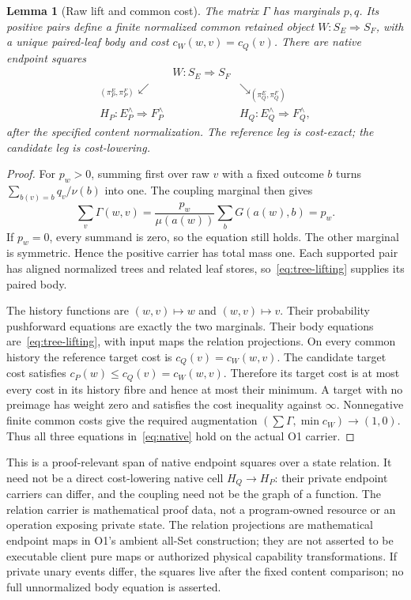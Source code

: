\documentclass[11pt,a4paper]{article}
\newtheorem{lemma}[theorem]{Lemma}
\theoremstyle{definition}
\begin{document}
\begin{lemma}[Raw lift and common cost]\label{lem:raw-lift}
The matrix $\Gamma$ has marginals $p,q$. Its positive pairs define a
finite normalized common retained object
$W:S_E\Rightarrow S_F$, with a unique paired-leaf body and cost
$c_W(w,v)=c_Q(v)$. There are native endpoint squares
\begin{equation}\label{eq:span}
 \begin{array}{ccc}
 &W:S_E\Rightarrow S_F&\\[-2pt]
 {}_{(\pi^E_P,\pi^F_P)}\swarrow&&
       \searrow_{(\pi^E_Q,\pi^F_Q)}\\[-2pt]
 H_P:E_P^{\wedge}\Rightarrow F_P^{\wedge}
 &&H_Q:E_Q^{\wedge}\Rightarrow F_Q^{\wedge},
 \end{array}
\end{equation}
after the specified content normalization. The reference leg is
cost-exact; the candidate leg is cost-lowering.
\end{lemma}
\begin{proof}
For $p_w>0$, summing first over raw $v$ with a fixed outcome $b$ turns
$\sum_{b(v)=b}q_v/\nu(b)$ into one. The coupling marginal then gives
\[
 \sum_v\Gamma(w,v)
 =\frac{p_w}{\mu(a(w))}\sum_bG(a(w),b)=p_w.
\]
If $p_w=0$, every summand is zero, so the equation still holds. The
other marginal is symmetric. Hence the positive carrier has total mass
one. Each supported pair has aligned normalized trees and related leaf
stores, so~\eqref{eq:tree-lifting} supplies its paired body.

The history functions are $(w,v)\mapsto w$ and $(w,v)\mapsto v$.
Their probability pushforward equations are exactly the two marginals.
Their body equations are~\eqref{eq:tree-lifting}, with input maps the
relation projections. On every common history the reference target cost
is $c_Q(v)=c_W(w,v)$. The candidate target cost satisfies
$c_P(w)\le c_Q(v)=c_W(w,v)$. Therefore its target cost is at most every
cost in its history fibre and hence at most their minimum. A target with
no preimage has weight zero and satisfies the cost inequality against
$\infty$. Nonnegative finite common costs give the required augmentation
$(\sum\Gamma,\min c_W)\to(1,0)$. Thus all three equations
in~\eqref{eq:native} hold on the actual O1 carrier.
\end{proof}
This is a proof-relevant span of native endpoint squares over a state
relation. It need not be a direct cost-lowering native cell $H_Q\to H_P$: their
private endpoint carriers can differ, and the coupling need not be the
graph of a function. The relation carrier is mathematical proof data,
not a program-owned resource or an operation exposing private state.
The relation projections are mathematical endpoint maps in O1's ambient
all-Set construction; they are not asserted to be executable client pure
maps or authorized physical capability transformations.
If private unary events differ, the squares live after the fixed content
comparison; no full unnormalized body equation is asserted.
\end{document}
